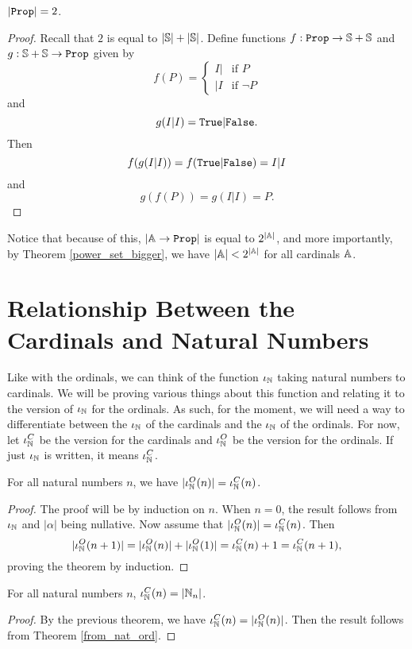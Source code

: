 \documentclass[../../math.tex]{subfiles}
\begin{document}
\begin{theorem}
    $|\Prop| = 2$.
\end{theorem}
\begin{proof}
    Recall that $2$ is equal to $|\S| + |\S|$.  Define functions $f : \Prop \to
    \S + \S$ and $g : \S + \S \to \Prop$ given by
    \[
        f(P) = \begin{cases}
            I| & \text{if $P$} \\
            |I & \text{if $\neg P$}
        \end{cases}
    \]
    and
    \[
        g(I|I) = \True|\False.
    \]
    Then
    \[
        f(g(I|I)) = f(\True|\False) = I|I
    \]
    and
    \[
        g(f(P)) = g(I|I) = P.
    \]
\end{proof}

Notice that because of this, $|\A \to \Prop|$ is equal to $2^{|\A|}$, and more
importantly, by Theorem \ref{power_set_bigger}, we have $|\A| < 2^{|\A|}$ for
all cardinals $\A$.

\section{Relationship Between the Cardinals and Natural Numbers}

Like with the ordinals, we can think of the function $\iN$ taking natural
numbers to cardinals.  We will be proving various things about this function and
relating it to the version of $\iN$ for the ordinals.  As such, for the moment,
we will need a way to differentiate between the $\iN$ of the cardinals and the
$\iN$ of the ordinals.  For now, let $\iN^C$ be the version for the cardinals
and $\iN^O$ be the version for the ordinals.  If just $\iN$ is written, it means
$\iN^C$.

\begin{theorem} \label{ord_to_card_nat}
    For all natural numbers $n$, we have $|\iN^O(n)| = \iN^C(n)$.
\end{theorem}
\begin{proof}
    The proof will be by induction on $n$.  When $n = 0$, the result follows
    from $\iN$ and $|\alpha|$ being nullative.  Now assume that $|\iN^O(n)| =
    \iN^C(n)$.  Then
    \[
        |\iN^O(n + 1)| = |\iN^O(n)| + |\iN^O(1)| = \iN^C(n) + 1 = \iN^C(n + 1),
    \]
    proving the theorem by induction.
\end{proof}

\begin{theorem} \label{from_nat_card}
    For all natural numbers $n$, $\iN^C(n) = |\N_n|$.
\end{theorem}
\begin{proof}
    By the previous theorem, we have $\iN^C(n) = |\iN^O(n)|$.  Then the result
    follows from Theorem \ref{from_nat_ord}.
\end{proof}
\end{document}
